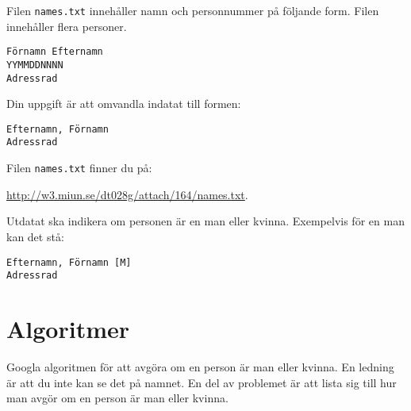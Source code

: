 \documentclass[a4paper]{miunasgn}
\begin{document}
\begin{questions}
	\question
	Filen \texttt{names.txt} innehåller namn och personnummer på följande form.
	Filen innehåller flera personer.
	\begin{verbatim}
Förnamn Efternamn
YYMMDDNNNN
Adressrad
	\end{verbatim}

	Din uppgift är att omvandla indatat till formen:
	\begin{verbatim}
Efternamn, Förnamn
Adressrad
	\end{verbatim}

	Filen \texttt{names.txt} finner du på:
	\begin{center}
		\url{http://w3.miun.se/dt028g/attach/164/names.txt}.
	\end{center}

	\question
	Utdatat ska indikera om personen är en man eller kvinna.
	Exempelvis för en man kan det stå:
	\begin{verbatim}
Efternamn, Förnamn [M]
Adressrad
	\end{verbatim}
	
\end{questions}





\section{Algoritmer}
\label{sec:Algoritmer}
Googla algoritmen för att avgöra om en person är man eller kvinna.
En ledning är att du inte kan se det på namnet.
En del av problemet är att lista sig till hur man avgör om en person är man 
eller kvinna.


%
\end{document}
